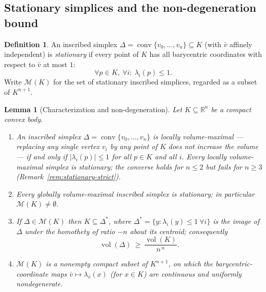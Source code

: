 \documentclass[11pt]{amsart}
\newtheorem{lemma}[theorem]{Lemma}
\theoremstyle{definition}
\newtheorem{definition}[theorem]{Definition}
\newcommand{\R}{\mathbb{R}}
\newcommand{\conv}{\operatorname{conv}}
\begin{document}
\subsection{Stationary simplices and the non-degeneration bound}

\begin{definition}\label{def:stationary}
An inscribed simplex $\Delta=\conv\{v_0,\dots,v_n\}\subseteq K$ (with
$\bar v$ affinely independent) is \emph{stationary} if every point of $K$ has
all barycentric coordinates with respect to $\bar v$ at most $1$:
\[
\forall p\in K,\ \forall i:\ \lambda_i(p)\le 1 .
\]
Write $\mathcal M(K)$ for the set of stationary inscribed simplices, regarded
as a subset of $K^{n+1}$.
\end{definition}

\begin{lemma}[Characterization and non-degeneration]
\label{lem:stationary}
Let $K\subseteq\R^n$ be a compact convex body.
\begin{enumerate}[label=\textup{(\roman*)}]
\item An inscribed simplex $\Delta=\conv\{v_0,\dots,v_n\}$ is
\emph{locally volume-maximal} --- replacing any single vertex $v_i$ by any
point of $K$ does not increase the volume --- if and only if
$|\lambda_i(p)|\le1$ for all $p\in K$ and all $i$. Every locally
volume-maximal simplex is stationary; the converse holds for $n\le2$ but
fails for $n\ge3$ (Remark~\ref{rem:stationary-strict}).
\item Every globally volume-maximal inscribed simplex is stationary; in
particular $\mathcal M(K)\ne\emptyset$.
\item If $\Delta\in\mathcal M(K)$ then $K\subseteq\Delta^{*}$, where
$\Delta^{*}=\{y:\lambda_i(y)\le1\ \forall i\}$ is the image of $\Delta$ under
the homothety of ratio $-n$ about its centroid; consequently
\[
\operatorname{vol}(\Delta)\ \ge\ \frac{\operatorname{vol}(K)}{n^{\,n}} .
\]
\item $\mathcal M(K)$ is a nonempty compact subset of $K^{n+1}$, on which the
barycentric-coordinate maps $\bar v\mapsto\lambda_{\bar v}(x)$ (for
$x\in K$) are continuous and uniformly nondegenerate.
\end{enumerate}
\end{lemma}
\end{document}
